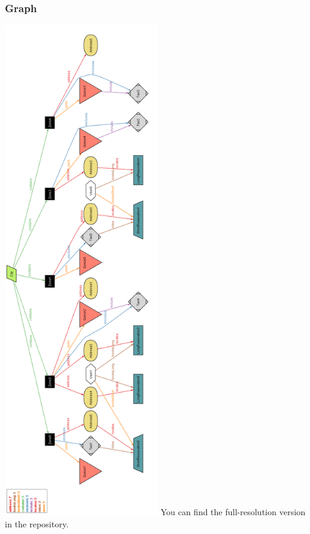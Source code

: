 	\subsubsection{Graph}
	\includegraphics[width=0.50\textwidth]{./images/alloy_graph}
	You can find the full-resolution version in the repository.